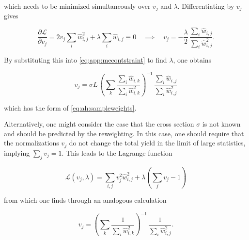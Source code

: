 \noindent which needs to be minimized simultaneously over $v_j$ and $\lambda$. Differentiating by $v_j$ gives

\begin{equation}
    \frac{\partial \mathcal{L}}{\partial v_j} = 2 v_j \sum_i \hat{w}_{i,j}^2 + \lambda \sum_i \hat{w}_{i,j} \equiv 0 \quad
    \implies \quad v_j = - \frac{\lambda}{2} \, \frac{\sum_i \hat{w}_{i,j}}{\sum_i \hat{w}_{i,j}^2} .
\end{equation}

By substituting this into \cref{eq:app:mecontstraint} to find $\lambda$, one obtains

\begin{equation}
    v_j = \sigma L \, \left( \sum_k \frac{\sum_i \hat{w}_{i,k}}{\sum_i \hat{w}_{i,k}^2} \right)^{-1} \, \frac{\sum_i \hat{w}_{i,j}}{\sum_i \hat{w}_{i,j}^2}
\end{equation}

\noindent which has the form of \cref{eq:ah:sampleweights}.

Alternatively, one might consider the case that the cross section $\sigma$ is not known and should be predicted by the reweighting. In this case, one should require that the normalizations $v_j$ do not change the total yield in the limit of large statistics, implying $\sum_j v_j = 1$. This leads to the Lagrange function

\begin{equation}
    \mathcal{L} (v_j, \lambda) = \sum_{i,j} v_j^2 \hat{w}_{i,j}^2 + \lambda \left( \sum_{j} v_j - 1 \right)
\end{equation}

\noindent from which one finds through an analogous calculation

\begin{equation}
    v_j = \left( \sum_k \frac{1}{\sum_i \hat{w}_{i,k}^2} \right)^{-1} \, \frac{1}{\sum_i \hat{w}_{i,j}^2} .
\end{equation}